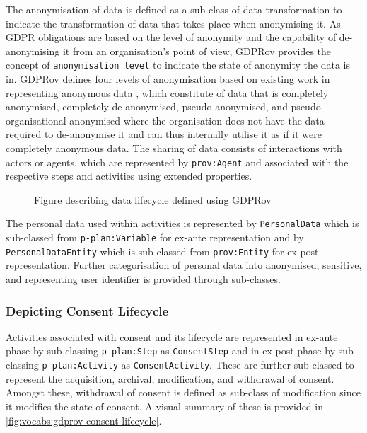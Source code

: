 The anonymisation of data is defined as a sub-class of data transformation to indicate the transformation of data that takes place when anonymising it.
As GDPR obligations are based on the level of anonymity and the capability of de-anonymising it from an organisation's point of view, GDPRov provides the concept of \texttt{anonymisation level} to indicate the state of anonymity the data is in.
GDPRov defines four levels of anonymisation based on existing work in representing anonymous data \cite{hintze_meeting_2017}, which constitute of data that is completely anonymised, completely de-anonymised, pseudo-anonymised, and pseudo-organisational-anonymised where the organisation does not have the data required to de-anonymise it and can thus internally utilise it as if it were completely anonymous data.
The sharing of data consists of interactions with actors or agents, which are represented by \texttt{prov:Agent} and associated with the respective steps and activities using extended properties.
\begin{figure}[htbp]
    \centering
    \missingfigure[figcolor=white]{}
    \caption{Figure describing data lifecycle defined using GDPRov}
    \label{fig:vocabs:gdprov-data-lifecycle}
\end{figure}

The personal data used within activities is represented by \texttt{PersonalData} which is sub-classed from \texttt{p-plan:Variable} for ex-ante representation and by \texttt{PersonalDataEntity} which is sub-classed from \texttt{prov:Entity} for ex-post representation.
Further categorisation of personal data into anonymised, sensitive, and representing user identifier is provided through sub-classes.

\subsubsection{Depicting Consent Lifecycle}
Activities associated with consent and its lifecycle are represented in ex-ante phase by sub-classing \texttt{p-plan:Step} as \texttt{ConsentStep} and in ex-post phase by sub-classing \texttt{p-plan:Activity} as \texttt{ConsentActivity}.
These are further sub-classed to represent the acquisition, archival, modification, and withdrawal of consent.
Amongst these, withdrawal of consent is defined as sub-class of modification since it modifies the state of consent.
A visual summary of these is provided in \autoref{fig:vocabs:gdprov-consent-lifecycle}.


